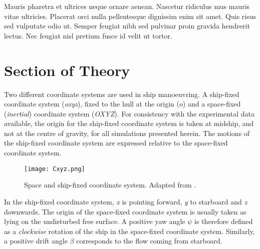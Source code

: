 Mauris pharetra et ultrices neque ornare aenean. Nascetur ridiculus mus mauris vitae ultricies. Placerat orci nulla pellentesque dignissim enim sit amet. Quis risus sed vulputate odio ut. Semper feugiat nibh sed pulvinar proin gravida hendrerit lectus. Nec feugiat nisl pretium fusce id velit ut tortor.


\section{Section of Theory}

Two different coordinate systems are used in ship manoeuvring. A ship-fixed coordinate system (\textit{oxyz}), fixed to the hull at the origin ($o$) and a space-fixed (\emph{inertial}) coordinate system (\textit{OXYZ}). For consistency with the experimental data available, the origin for the ship-fixed coordinate system is taken at midship, and not at the centre of gravity, for all simulations presented herein. The motions of the ship-fixed coordinate system are expressed relative to the space-fixed coordinate system. 

\begin{figure}[H]
	\centering
	\texttt{[image: Cxyz.png]}
	\caption[Space and ship-fixed coordinate system.]{Space and ship-fixed coordinate system. Adapted from \citet{luo2016parameter}.}
	\label{fig:cxyz}
\end{figure}
In the ship-fixed coordinate system, \textit{x} is pointing forward, \textit{y} to starboard and \textit{z} downwards. The origin of the space-fixed coordinate system is usually taken as lying on the undisturbed free surface.  A positive yaw angle $\psi$ is therefore defined as a \emph{clockwise} rotation of the ship in the space-fixed coordinate system. Similarly, a positive drift angle $\beta$ corresponds to the flow coming from starboard.